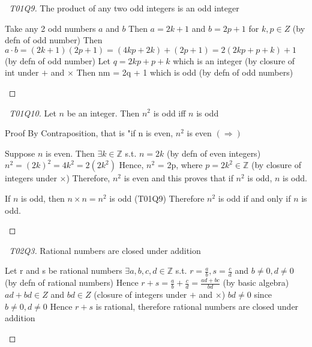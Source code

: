 \documentclass[a4paper]{article}
\theoremstyle{definition}
\begin{document}
\begin{proof}[\proofname\ T01Q9] The product of any two odd integers is an odd integer
  \begin{numpf*}
    \pfln Take any 2 odd numbers $a$ and $b$
    \pfln Then $a = 2k+1$ and $b = 2p + 1$ for $k,p \in Z$ (by defn of odd number)
    \pfln Then $a\cdot b = (2k+1)(2p+1) = (4kp + 2k) + (2p + 1) = 2(2kp + p + k) +1$ (by defn of odd number)
    \pfln Let $q = 2kp + p +k$ which is an integer (by closure of int under $+$ and $\times$
    \pfln Then nm = 2q + 1 which is odd (by defn of odd numbers)
  \end{numpf*}
\end{proof}

\begin{proof}[\proofname\ T01Q10] Let $n$ be an integer. Then $n^2$ is odd iff $n$ is odd
  \begin{numpf*}
    \pfln Proof By Contraposition, that is "if n is even, $n^2$ is even $(\Rightarrow)$
    \begin{subpf*}
      \pfln Suppose $n$ is even.
      \pfln Then $\exists k \in \mathbb{Z}$ s.t. $n = 2k$ (by defn of even integers)
      \pfln $n^2 = (2k)^2 = 4k^2 = 2(2k^2)$
      \pfln Hence, $n^2$ = 2p, where $p = 2k^2 \in \mathbb{Z}$ (by closure of integers under $\times$)
      \pfln Therefore, $n^2$ is even and this proves that if $n^2$ is odd, $n$ is odd.
    \end{subpf*}
    \pfln If $n$ is odd, then $n \times n = n^2$ is odd (T01Q9)
    \pfln Therefore $n^2$ is odd if and only if $n$ is odd.
  \end{numpf*}
\end{proof}

\begin{proof}[\proofname\ T02Q3] Rational numbers are closed under addition
  \begin{numpf*}
    \pfln Let r and s be rational numbers
    \pfln $\exists a,b,c,d \in \mathbb{Z}$ s.t. $r =\frac{a}{b}, s = \frac{c}{d}$ and $b \not = 0, d \not = 0$ (by defn of rational numbers)
    \pfln Hence $r + s = \frac{a}{b} + \frac{c}{d} = \frac{ad + bc}{bd}$ (by basic algebra)
    \pfln $ad + bd \in Z$ and $bd \in Z$ (closure of integers under $+$ and $\times$)
    \pfln $bd \not = 0$ since $b \not = 0, d \not = 0$
    \pfln Hence $r+s$ is rational, therefore rational numbers are closed under addition
  \end{numpf*}
\end{proof}
\end{document}
